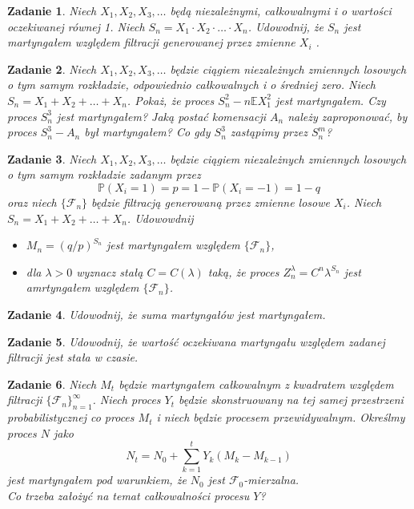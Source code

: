 \documentclass{mwart}
\newtheorem{zd}{Zadanie}
\begin{document}
\begin{zd}
Niech $X_1, X_2, X_3, \dots$ będą niezależnymi, całkowalnymi i o wartości oczekiwanej równej 1. Niech $S_n = X_1\cdot X_2\cdot \dots \cdot X_n$. Udowodnij, że $S_n$ jest martyngałem względem filtracji generowanej przez zmienne $X_i$ .
\end{zd}

\begin{zd}
Niech $X_1, X_2, X_3, \dots$ będzie ciągiem niezależnych zmiennych losowych o tym samym rozkładzie, odpowiednio całkowalnych i o średniej zero. Niech $S_n = X_1+X_2+\dots + X_n$. Pokaż, że proces $S_n^2 - n\mathbb{E}X_1^2$  jest martyngałem. Czy proces $S_n^3$ jest martyngałem? Jaką postać komensacji $A_n$ należy zaproponować, by proces $S_n^3-A_n$ był martyngałem? Co gdy $S_n^3$ zastąpimy przez $S_n^m$?
\end{zd}

\begin{zd}
Niech $X_1, X_2, X_3, \dots$ będzie ciągiem niezależnych zmiennych losowych o tym samym rozkładzie zadanym przez
\begin{displaymath}
\mathbb{P}\left(X_i = 1\right) = p = 1-\mathbb{P}\left(X_i = -1\right) = 1-q
\end{displaymath}
oraz niech $\{\mathcal{F}_n\}$ będzie filtracją generowaną przez zmienne losowe $X_i$. Niech $S_n = X_1 + X_2 + \dots +X_n$. Udowowdnij
\begin{itemize}
\item $M_n = \left(q/p\right)^{S_n}$ jest martyngałem względem $\{\mathcal{F}_n\}$,
\item dla $\lambda >0 $ wyznacz stałą $C = C(\lambda)$ taką, że proces $Z_n^{\lambda} = C^n\lambda^{S_n}$ jest amrtyngałem względem $\{\mathcal{F}_n\}$.
\end{itemize}
\end{zd}


\begin{zd}
Udowodnij, że suma martyngałów jest martyngałem.
\end{zd}

\begin{zd}
Udowodnij, że wartość oczekiwana martyngału względem zadanej filtracji jest stała w czasie.
\end{zd}

\begin{zd}
Niech $M_t$ będzie martyngałem całkowalnym z kwadratem względem filtracji $\{\mathcal{F}_n\}_{n=1}^{\infty}$. Niech proces $Y_t$ będzie skonstruowany na tej samej przestrzeni probabilistycznej co proces $M_t$ i niech będzie procesem przewidywalnym. Określmy proces $N$ jako
\begin{displaymath}
N_t = N_0 + \sum_{k=1}^tY_k\left(M_k - M_{k-1}\right)
\end{displaymath}
jest martyngałem pod warunkiem, że $N_0$ jest $\mathcal{F}_0$-mierzalna.\\
Co trzeba założyć na temat całkowalności procesu $Y$?
\end{zd}
\end{document}
